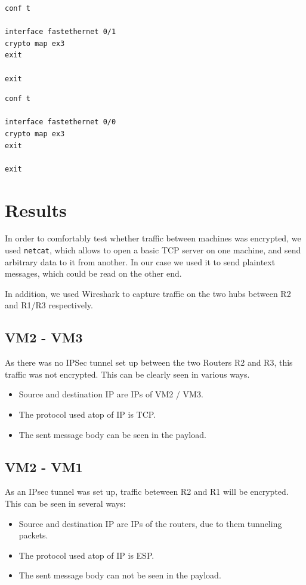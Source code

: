 \documentclass[a4paper]{scrreprt}
\begin{document}
\begin{lstlisting}[caption=Router 1]
conf t

interface fastethernet 0/1
crypto map ex3
exit

exit
\end{lstlisting}

\begin{lstlisting}[caption=Router 2]
conf t

interface fastethernet 0/0
crypto map ex3
exit

exit
\end{lstlisting}

\section{Results}

In order to comfortably test whether traffic between machines was encrypted, we
used \texttt{netcat}, which allows to open a basic TCP server on one machine,
and send arbitrary data to it from another. In our case we used it to send
plaintext messages, which could be read on the other end.

In addition, we used Wireshark to capture traffic on the two hubs between R2
and R1/R3 respectively.

\subsection{VM2 - VM3}

As there was no IPSec tunnel set up between the two Routers R2 and R3, this
traffic was not encrypted. This can be clearly seen in various ways.

\begin{itemize}
\item Source and destination IP are IPs of VM2 / VM3.
\item The protocol used atop of IP is TCP.
\item The sent message body can be seen in the payload.
\end{itemize}

\subsection{VM2 - VM1}

As an IPsec tunnel was set up, traffic beteween R2 and R1 will be encrypted.
This can be seen in several ways:

\begin{itemize}
\item Source and destination IP are IPs of the routers, due to them tunneling
	packets.
\item The protocol used atop of IP is ESP.
\item The sent message body can not be seen in the payload.
\end{itemize}
\end{document}
